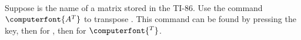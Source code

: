 \contributedby{\ericfickenscher}\\
Suppose  is the name of a matrix stored in the TI-86.  
Use the command $\computerfont{A^T}$ to transpose .  This command can be found by 
pressing the  key, then  for , then  for $\computerfont{^T}$. 